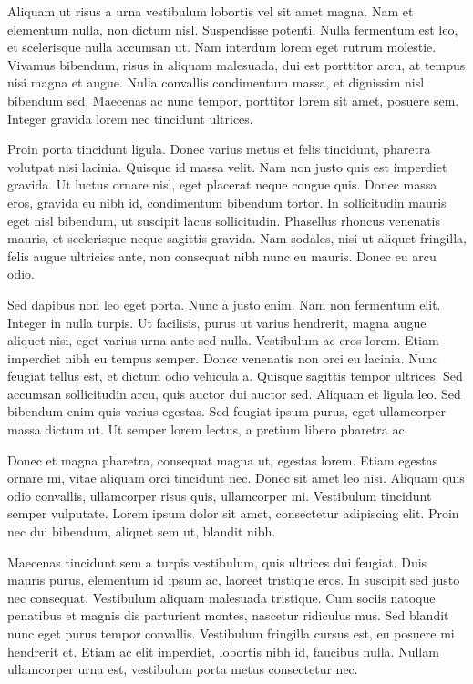 \documentclass[11pt,a4paper]{memoir}\usepackage[]{graphicx}\usepackage[]{color}
\begin{document}
Aliquam ut risus a urna vestibulum lobortis vel sit amet magna. Nam et elementum nulla, non dictum nisl. Suspendisse potenti. Nulla fermentum est leo, et scelerisque nulla accumsan ut. Nam interdum lorem eget rutrum molestie. Vivamus bibendum, risus in aliquam malesuada, dui est porttitor arcu, at tempus nisi magna et augue. Nulla convallis condimentum massa, et dignissim nisl bibendum sed. Maecenas ac nunc tempor, porttitor lorem sit amet, posuere sem. Integer gravida lorem nec tincidunt ultrices.

Proin porta tincidunt ligula. Donec varius metus et felis tincidunt, pharetra volutpat nisi lacinia. Quisque id massa velit. Nam non justo quis est imperdiet gravida. Ut luctus ornare nisl, eget placerat neque congue quis. Donec massa eros, gravida eu nibh id, condimentum bibendum tortor. In sollicitudin mauris eget nisl bibendum, ut suscipit lacus sollicitudin. Phasellus rhoncus venenatis mauris, et scelerisque neque sagittis gravida. Nam sodales, nisi ut aliquet fringilla, felis augue ultricies ante, non consequat nibh nunc eu mauris. Donec eu arcu odio.

Sed dapibus non leo eget porta. Nunc a justo enim. Nam non fermentum elit. Integer in nulla turpis. Ut facilisis, purus ut varius hendrerit, magna augue aliquet nisi, eget varius urna ante sed nulla. Vestibulum ac eros lorem. Etiam imperdiet nibh eu tempus semper. Donec venenatis non orci eu lacinia. Nunc feugiat tellus est, et dictum odio vehicula a. Quisque sagittis tempor ultrices. Sed accumsan sollicitudin arcu, quis auctor dui auctor sed. Aliquam et ligula leo. Sed bibendum enim quis varius egestas. Sed feugiat ipsum purus, eget ullamcorper massa dictum ut. Ut semper lorem lectus, a pretium libero pharetra ac.

Donec et magna pharetra, consequat magna ut, egestas lorem. Etiam egestas ornare mi, vitae aliquam orci tincidunt nec. Donec sit amet leo nisi. Aliquam quis odio convallis, ullamcorper risus quis, ullamcorper mi. Vestibulum tincidunt semper vulputate. Lorem ipsum dolor sit amet, consectetur adipiscing elit. Proin nec dui bibendum, aliquet sem ut, blandit nibh.

Maecenas tincidunt sem a turpis vestibulum, quis ultrices dui feugiat. Duis mauris purus, elementum id ipsum ac, laoreet tristique eros. In suscipit sed justo nec consequat. Vestibulum aliquam malesuada tristique. Cum sociis natoque penatibus et magnis dis parturient montes, nascetur ridiculus mus. Sed blandit nunc eget purus tempor convallis. Vestibulum fringilla cursus est, eu posuere mi hendrerit et. Etiam ac elit imperdiet, lobortis nibh id, faucibus nulla. Nullam ullamcorper urna est, vestibulum porta metus consectetur nec.
\end{document}
